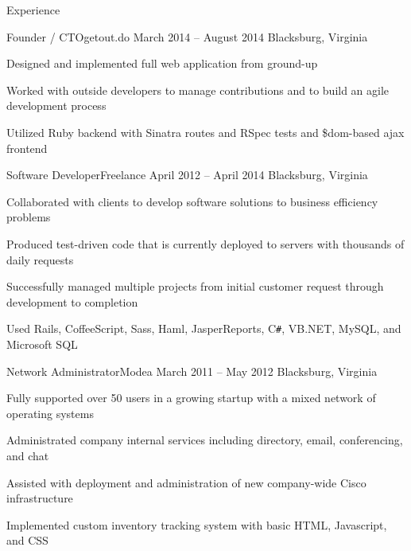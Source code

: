 \documentclass{resume}
\begin{document}
\begin{section}{Experience}
		\begin{experience}{Founder / CTO}{getout.do}
		                  {March 2014 – August 2014}
		                  {Blacksburg, Virginia}
			\item Designed and implemented full web application from
                          ground-up
			\item Worked with outside developers to manage
                          contributions and to build an agile development
                          process
			\item Utilized Ruby backend with Sinatra routes and
                          RSpec tests and \$dom-based ajax frontend
		\end{experience}

		\begin{experience}{Software Developer}{Freelance}
		                  {April 2012 – April 2014}
		                  {Blacksburg, Virginia}
			\item Collaborated with clients to develop software
                          solutions to business efficiency problems
			\item Produced test-driven code that is currently
                          deployed to servers with thousands of daily requests
			\item Successfully managed multiple projects from
                          initial customer request through development to
                          completion
			\item Used Rails, CoffeeScript, Sass, Haml,
                          JasperReports, C\texttt{\#}, VB.NET, MySQL, and
                          Microsoft SQL
		\end{experience}

		\begin{experience}{Network Administrator}{Modea}
		                  {March 2011 – May 2012}
		                  {Blacksburg, Virginia}
			\item Fully supported over 50 users in a growing startup
                          with a mixed network of operating systems
			\item Administrated company internal services including
                          directory, email, conferencing, and chat
			\item Assisted with deployment and administration of new
                          company-wide Cisco infrastructure
			\item Implemented custom inventory tracking system with
                          basic HTML, Javascript, and CSS
		\end{experience}


\end{section}
\end{document}
